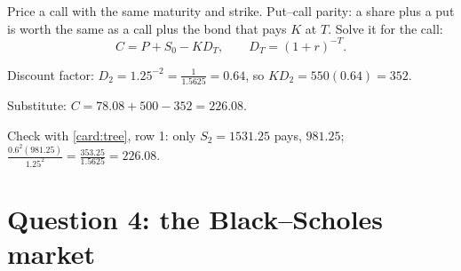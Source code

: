 \begin{problem}[Q3(iv)]
Price a call with the same maturity and strike.
\cardsays Put--call parity: a share plus a put is worth the same as a call plus the bond that pays $K$ at $T$. Solve it for the call:
\[
C=P+S_0-KD_T,\qquad D_T=(1+r)^{-T}.
\]
\working
\begin{steps}
\item Discount factor: $D_2=1.25^{-2}=\frac1{1.5625}=0.64$, so $KD_2=550(0.64)=352$.
\item Substitute: $C=78.08+500-352=226.08$.
\item Check with \cref{card:tree}, row 1: only $S_2=1531.25$ pays, $981.25$; $\frac{0.6^2(981.25)}{1.25^2}=\frac{353.25}{1.5625}=226.08$.
\end{steps}
\end{problem}

\section{Question 4: the Black--Scholes market}

